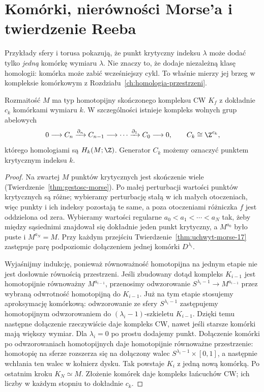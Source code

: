 \section{Komórki, nierówności Morse'a i twierdzenie Reeba}
\label{sec:nierownosci-morse-17}

Przykłady sfery i torusa pokazują, że
punkt krytyczny indeksu $\lambda$ może
dodać tylko \emph{jedną} komórkę wymiaru
$\lambda$. Nie znaczy to, że dodaje
niezależną klasę homologii:
komórka może zabić wcześniejszy cykl.
To właśnie mierzy jej brzeg w kompleksie
komórkowym z
Rozdziału~\ref{ch:homologia-przestrzeni}.

\begin{twierdzenie}
\label{thm:cw-morse-17}
Rozmaitość $M$ ma typ homotopijny
skończonego kompleksu CW $K_f$
z dokładnie $c_k$ komórkami
wymiaru $k$. W szczególności
istnieje kompleks wolnych grup
abelowych
\[
 0\longrightarrow C_n
 \xrightarrow{\partial_n}C_{n-1}
 \longrightarrow\cdots
 \xrightarrow{\partial_1}C_0
 \longrightarrow0,\qquad
 C_k\cong\Z^{c_k},
\]
którego homologiami są $H_k(M;\Z)$.
Generator $C_k$ możemy oznaczyć
punktem krytycznym indeksu $k$.
\end{twierdzenie}
\begin{proof}
Na zwartej $M$ punktów krytycznych
jest skończenie wiele
(Twierdzenie~\ref{thm:gestosc-morse}).
Po małej perturbacji wartości
punktów krytycznych są różne;
wybieramy perturbację stałą
w ich małych otoczeniach,
więc punkty i ich indeksy
pozostają te same, a poza
otoczeniami różniczka $f$
jest oddzielona od zera.
Wybieramy wartości
regularne
$a_0<a_1<\cdots<a_N$
tak, żeby między sąsiednimi
znajdował się dokładnie jeden
punkt krytyczny, a $M^{a_0}$
było puste i $M^{a_N}=M$.
Przy każdym przejściu
Twierdzenie~\ref{thm:uchwyt-morse-17}
zastępuje parę podpoziomic
dołączeniem jednej komórki
$D^{\lambda_i}$.

Wyjaśnijmy indukcję, ponieważ
równoważność homotopijna na
jednym etapie nie jest dosłownie
równością przestrzeni.
Jeśli zbudowany dotąd kompleks
$K_{i-1}$ jest homotopijnie
równoważny $M^{a_{i-1}}$,
przenosimy odwzorowanie
$S^{\lambda_i-1}\to M^{a_{i-1}}$
przez wybraną odwrotność
homotopijną do $K_{i-1}$.
Już na tym etapie stosujemy aproksymację komórkową:
odwzorowanie ze sfery $S^{\lambda_i-1}$ zastępujemy homotopijnym
odwzorowaniem do $(\lambda_i-1)$-szkieletu $K_{i-1}$.
Dzięki temu następne dołączenie rzeczywiście daje
kompleks CW, nawet jeśli starsze komórki mają większy wymiar.
Dla $\lambda_i=0$ po prostu dodajemy punkt.
Dołączenie komórki po odwzorowaniach
homotopijnych daje
homotopijnie równoważne
przestrzenie: homotopię
na sferze rozszerza się
na dołączony walec
$S^{\lambda_i-1}\times[0,1]$,
a następnie wchłania ten
walec w kołnierz dysku.
Tak powstaje $K_i$ z jedną
nową komórką.
Po ostatnim kroku
$K_N\simeq M$.
Złożenie komórek daje
kompleks łańcuchów CW;
ich liczby w każdym stopniu
to dokładnie $c_k$.
\end{proof}

